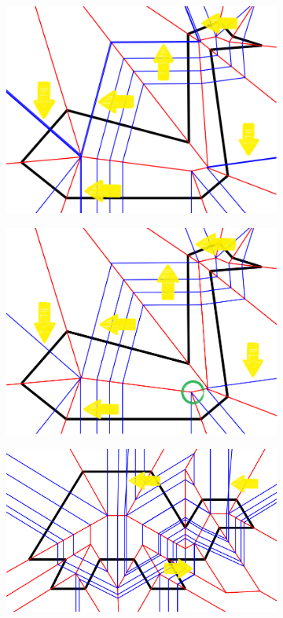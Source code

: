 \documentclass[11pt]{article}
\begin{document}
 \begin{figure}[H]
\centering
  \begin{subfigure}[b]{0.48\textwidth}
    \includegraphics[width=\textwidth]{FIGS/Part5/dup1}
    \caption{}
    \label{fig:dd01}
  \end{subfigure}
  \begin{subfigure}[b]{0.48\textwidth}
    \includegraphics[width=\textwidth]{FIGS/Part5/dedup1}
    \caption{}
     \label{fig:dd02}
  \end{subfigure}
  \begin{subfigure}[b]{0.48\textwidth}
    \includegraphics[width=\textwidth]{FIGS/Part5/dup2}

\end{subfigure}
\end{figure}
\end{document}
